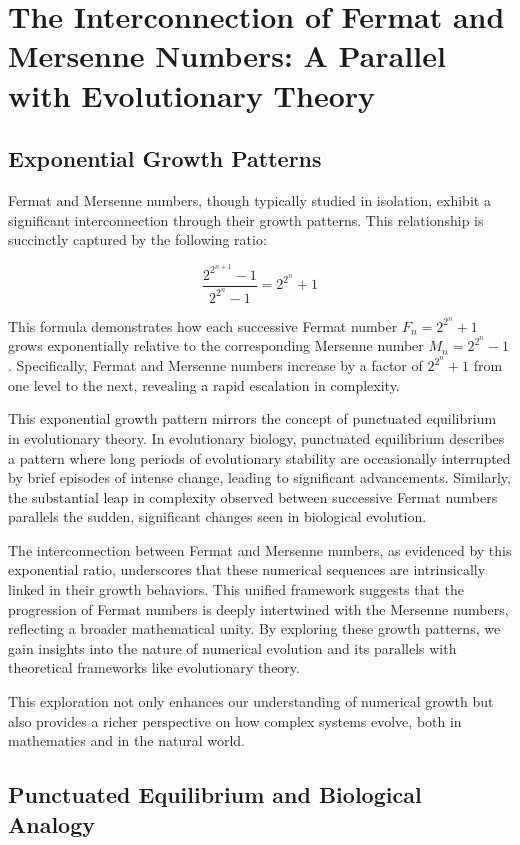 \documentclass[12pt]{article}
\begin{document}
\section{The Interconnection of Fermat and Mersenne Numbers: A Parallel with Evolutionary Theory}

\subsection{Exponential Growth Patterns}

Fermat and Mersenne numbers, though typically studied in isolation, exhibit a significant interconnection through their growth patterns. This relationship is succinctly captured by the following ratio:

\[
\frac{2^{2^{n+1}} - 1}{2^{2^n} - 1} = 2^{2^n} + 1
\]

This formula demonstrates how each successive Fermat number \( F_n = 2^{2^n} + 1 \) grows exponentially relative to the corresponding Mersenne number \( M_n = 2^{2^n} - 1 \). Specifically, Fermat and Mersenne numbers increase by a factor of \( 2^{2^n} + 1 \) from one level to the next, revealing a rapid escalation in complexity.

This exponential growth pattern mirrors the concept of punctuated equilibrium in evolutionary theory. In evolutionary biology, punctuated equilibrium describes a pattern where long periods of evolutionary stability are occasionally interrupted by brief episodes of intense change, leading to significant advancements. Similarly, the substantial leap in complexity observed between successive Fermat numbers parallels the sudden, significant changes seen in biological evolution.

The interconnection between Fermat and Mersenne numbers, as evidenced by this exponential ratio, underscores that these numerical sequences are intrinsically linked in their growth behaviors. This unified framework suggests that the progression of Fermat numbers is deeply intertwined with the Mersenne numbers, reflecting a broader mathematical unity. By exploring these growth patterns, we gain insights into the nature of numerical evolution and its parallels with theoretical frameworks like evolutionary theory.

This exploration not only enhances our understanding of numerical growth but also provides a richer perspective on how complex systems evolve, both in mathematics and in the natural world.


\subsection{Punctuated Equilibrium and Biological Analogy}
\end{document}
